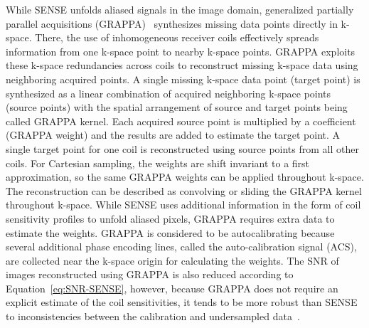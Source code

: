 \documentclass[english,version-2022-01]{uzl-thesis} %
\begin{document}
While SENSE unfolds aliased signals in the image domain, generalized partially parallel acquisitions (GRAPPA)~\cite{GRAPPA} synthesizes missing data points directly in k-space. 
There, the use of inhomogeneous receiver coils effectively spreads information from one k-space point to nearby k-space points. GRAPPA exploits these k-space redundancies across coils to reconstruct missing k-space data using neighboring acquired points. A single missing k-space data point (target point) is synthesized as a linear combination of acquired neighboring k-space points (source points) with the spatial arrangement of source and target points being called GRAPPA kernel. Each acquired source point is multiplied by a coefficient (GRAPPA weight) and the results are added to estimate the target point. A single target point for one coil is reconstructed using source points from all other coils. For Cartesian sampling, the weights are shift invariant to a first approximation, so the same GRAPPA weights can be applied throughout k-space. The reconstruction can be described as convolving or sliding the GRAPPA kernel throughout k-space.
While SENSE uses additional information in the form of coil sensitivity profiles to unfold aliased pixels, GRAPPA requires extra data to estimate the weights. GRAPPA is considered to be autocalibrating because several additional phase encoding lines, called the auto-calibration signal (ACS), are collected near the k-space origin for calculating the weights. 
The SNR of images reconstructed using GRAPPA is also reduced according to Equation~\ref{eq:SNR-SENSE}, however, because GRAPPA does not require an explicit estimate of the coil sensitivities, it tends to be more robust than SENSE to inconsistencies between the calibration and undersampled data~\cite{AdvancesPI}.
\end{document}

